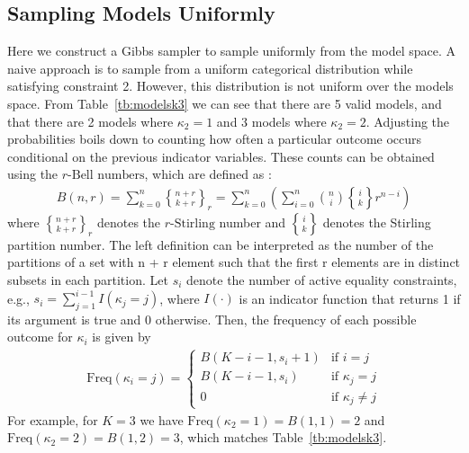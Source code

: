 \documentclass[]{article}
\newcommand{\cindicator}{\kappa}%
\newcommand{\stirling}[2]{\genfrac{\{}{\}}{0pt}{}{#1}{#2}} %
\newcommand{\bellnum}[2]{B\left(#1, #2\right)}
\newcommand{\frequency}[1]{\text{Freq}\left(#1\right)}
\begin{document}
\subsection*{Sampling Models Uniformly}
Here we construct a Gibbs sampler to sample uniformly from the model space.
A naive approach is to sample from a uniform categorical distribution while satisfying constraint 2.
However, this distribution is not uniform over the models space.
From Table~\ref{tb:modelsk3} we can see that there are 5 valid models, and that there are 2 models where $\kappa_2 = 1$ and 3 models where $\kappa_2 = 2$.
Adjusting the probabilities boils down to counting how often a particular outcome occurs conditional on the previous indicator variables.
These counts can be obtained using the $r\text{-Bell numbers}$, which are defined as \parencite{mezo2011r}:
\begin{align*}
	\bellnum{n}{r} = 
	\sum_{k=0}^{n} \stirling{n+r}{k+r}_r =
	\sum_{k=0}^{n} \left(\sum_{i=0}^{n} \binom{n}{i} \stirling{i}{k} r^{n - i} \right)
\end{align*}
where $\stirling{n+r}{k+r}_r$ denotes the $r\text{-Stirling}$ number and $\stirling{i}{k}$ denotes the Stirling partition number.
The left definition can be interpreted as the number of the partitions of a set with n + r element such that the first r elements are in distinct subsets in each partition.
Let $s_i$ denote the number of active equality constraints, e.g., $s_i = \sum_{j = 1}^{i-1} I(\cindicator_j = j)$, where $I(\cdot)$ is an indicator function that returns 1 if its argument is true and 0 otherwise.
Then, the frequency of each possible outcome for $\cindicator_i$ is given by
\begin{align*}
	\frequency{\cindicator_i = j} = \begin{cases}
	\bellnum{K - i - 1}{s_i + 1} 		& \text{if } i = j					\\
	\bellnum{K - i - 1}{s_i} 			& \text{if } \cindicator_j = j 		\\
	0 									& \text{if } \cindicator_j \neq j
	\end{cases}
\end{align*}
For example, for $K = 3$ we have $\frequency{\cindicator_2 = 1} = \bellnum{1}{1} = 2$ and $\frequency{\cindicator_2 = 2} = \bellnum{1}{2} = 3$, which matches Table~\ref{tb:modelsk3}.
\end{document}

